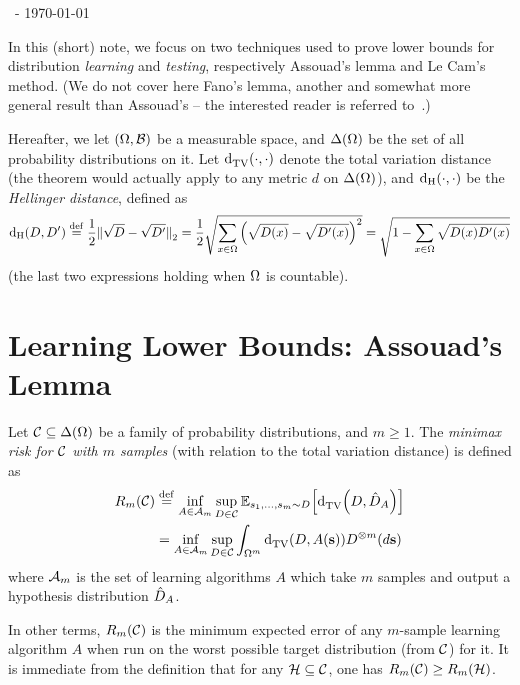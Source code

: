 \documentclass[11pt]{article}
\title{\maintitle}
\author{\authorname}
\date{May, 2014}
\begin{document}
\begin{flushleft}\sf\footnotesize
\makeatletter
\@date~- \today \hfill \@title
\makeatother
\end{flushleft}
\vspace{5mm}

In this (short) note, we focus on two techniques used to prove lower bounds for distribution \emph{learning} and \emph{testing}, respectively Assouad's lemma and Le Cam's method. (We do not cover here Fano's lemma, another and somewhat more general result than Assouad's -- the interested reader is referred to~\cite{Yu:97}.)\medskip

Hereafter, we let $(\Omega,\mathcal{B})$ be a measurable space, and $\Delta\!\left(\Omega\right)$ be the set of all probability distributions on it. Let ${\operatorname{d}_{\rm TV}^{}\!\left({\cdot, \cdot}\right)}$ denote the total variation distance (the theorem would actually apply to any metric $d$ on $\Delta\!\left(\Omega\right)$), and ${\operatorname{d_{\rm{}H}}\!\left({\cdot, \cdot}\right)}$ be the \emph{Hellinger distance}, defined as
\[
{\operatorname{d_{\rm{}H}}\!\left({D, D^\prime}\right)}\stackrel{\rm def}{=}\frac{1}{2}{\lVert\sqrt{D}-\sqrt{D^\prime}{\rVert}}_2 = \frac{1}{2}\sqrt{\sum_{x\in \Omega}\left(\sqrt{D(x)}-\sqrt{D^\prime(x)}\right)^2} = \sqrt{1 - \sum_{x\in \Omega} \sqrt{D(x)D^\prime(x)}}
\]
(the last two expressions holding when $\Omega$ is countable).

\section{Learning Lower Bounds: Assouad's Lemma}

\begin{definition}
Let $\mathcal{C}\subseteq\Delta\!\left(\Omega\right)$ be a family of probability distributions, and $m\geq 1$. The \emph{minimax risk for $\mathcal{C}$ with $m$ samples} (with relation to the total variation distance) is defined as
  \begin{align}\label{eq:minimax:risk}
    R_m(\mathcal{C}) &\stackrel{\rm def}{=} \inf_{A\in \mathcal{A}_m} \sup_{D\in\mathcal{C} } \mathbb{E}_{s_1,\dots,s_m\sim D}\!\left[ {\operatorname{d}_{\rm TV}^{}\!\left({ D ,  \hat{D}_A }\right)} \right] \\
    &= \inf_{A\in\mathcal{A}_m} \sup_{D\in\mathcal{C} } \int_{\Omega^m} {\operatorname{d}_{\rm TV}^{}\!\left({ D ,  A(\mathbf{s}) }\right)}D^{\otimes m}(d\mathbf{s}) \notag{}
  \end{align}
  where $\mathcal{A}_m$ is the set of  learning algorithms $A$ which take $m$ samples and output a hypothesis distribution $\hat{D}_A$.
\end{definition}
\noindent In other terms, $R_m(\mathcal{C})$ is the minimum expected error of any $m$-sample learning algorithm $A$ when run on the worst possible target distribution (from $\mathcal{C}$) for it. It is immediate from the definition that for any $\mathcal{H}\subseteq \mathcal{C}$, one has $R_m(\mathcal{C}) \geq R_m(\mathcal{H})$.\medskip
\end{document}
